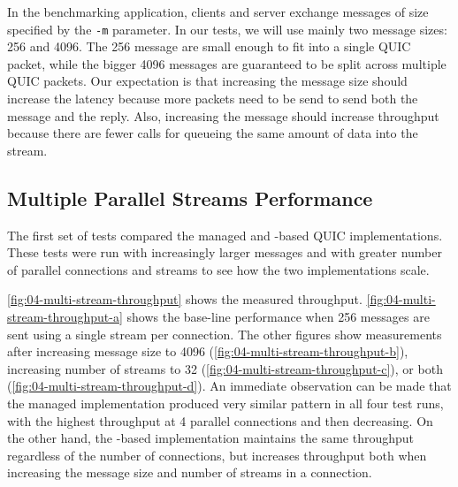 In the benchmarking application, clients and server exchange messages of size specified by the
\texttt{-m} parameter. In our tests, we will use mainly two message sizes: \SI{256}{\byte} and
\SI{4096}{\byte}. The \SI{256}{\byte} message are small enough to fit into a single QUIC packet,
while the bigger \SI{4096}{\byte} messages are guaranteed to be split across multiple QUIC packets.
Our expectation is that increasing the message size should increase the latency because more packets
need to be send to send both the message and the reply. Also, increasing the message should increase
throughput because there are fewer calls for queueing the same amount of data into the stream.

\subsection{Multiple Parallel Streams Performance}\label{sec:04-multi-stream-perf}

The first set of tests compared the managed and \libmsquic{}-based QUIC implementations. These tests
were run with increasingly larger messages and with greater number of parallel connections and
streams to see how the two implementations scale.

 \autoref{fig:04-multi-stream-throughput} shows the
measured throughput. \autoref{fig:04-multi-stream-throughput-a} shows the base-line performance when
\SI{256}{\byte} messages are sent using a single stream per connection. The other figures show
measurements after increasing message size to \SI{4096}{\byte}
(\autoref{fig:04-multi-stream-throughput-b}), increasing number of streams to 32
(\autoref{fig:04-multi-stream-throughput-c}), or both (\autoref{fig:04-multi-stream-throughput-d}).
An immediate observation can be made that the managed implementation produced very similar pattern
in all four test runs, with the highest throughput at 4 parallel connections and then decreasing. On
the other hand, the \libmsquic{}-based implementation maintains the same throughput regardless of
the number of connections, but increases throughput both when increasing the message size and number
of streams in a connection.

